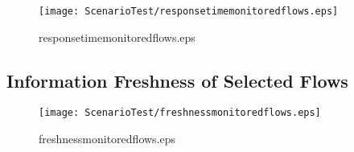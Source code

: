 \documentclass{elsart}
\begin{document}
\begin{figure}[ht]
\centering
\texttt{[image: ScenarioTest/responsetimemonitoredflows.eps]}
\caption{responsetimemonitoredflows.eps}\label{fig:responsetimemonitoredflows}
\end{figure}

\clearpage
\subsection{Information Freshness of Selected Flows}

\begin{figure}[ht]
\centering
\texttt{[image: ScenarioTest/freshnessmonitoredflows.eps]}
\caption{freshnessmonitoredflows.eps}\label{fig:freshnessmonitoredflows}
\end{figure}

\clearpage
\end{document}
